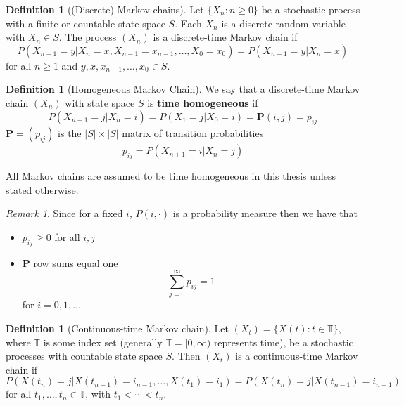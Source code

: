 \documentclass{article}
\theoremstyle{plain}
\theoremstyle{definition}
\newtheorem{defn}[theorem]{Definition}
\theoremstyle{remark}
\newtheorem*{remark}{Remark}
\numberwithin{equation}{section}
\begin{document}
\begin{defn}[(Discrete) Markov chains] \cite{grimmett2001}
Let $\{X_n : n \geq 0\}$ be a stochastic process with a finite or countable state space $S$.
Each $X_n$ is a discrete random variable with $X_n \in S$.
The process $(X_n)$ is a discrete-time Markov chain if
$$
P(X_{n + 1} = y | X_n = x, X_{n - 1} = x_{n - 1}, \ldots, X_0 = x_0) = P(X_{n + 1} = y | X_n = x)
$$
for all $n \geq 1$ and $y, x, x_{n-1}, \ldots, x_0 \in S$.
\end{defn}

\begin{defn}[Homogeneous Markov Chain]\cite{grimmett2001}
We say that a discrete-time Markov chain $(X_n)$ with state space $S$ is \textbf{time homogeneous} if
$$
P(X_{n + 1} = j | X_n = i) = P(X_{1} = j | X_0 = i) = \mathbf{P}(i,j) = p_{ij}
$$
$\mathbf{P} = (p_{ij})$ is the $|S| \times |S|$ matrix of transition probabilities
$$
p_{ij} = P(X_{n + 1} = i | X_n = j)
$$

All Markov chains are assumed to be time homogeneous in this thesis unless stated otherwise.
\end{defn}

\begin{remark}
Since for a fixed $i$, $P(i, \cdot)$ is a probability measure then we have that
\begin{itemize}
    \item $p_{ij} \geq 0$ for all $i,j$
    \item $\mathbf{P}$ row sums equal one
    $$
    \sum_{j = 0}^\infty p_{ij} = 1
    $$
    for $i = 0, 1, \ldots$
\end{itemize}
\end{remark}

\begin{defn}[Continuous-time Markov chain] \cite{grimmett2001}
Let $(X_t) = \{X(t) : t \in \mathbb T\}$, where $\mathbb T$ is some index set (generally $\mathbb T = [0, \infty)$ represents time), be a stochastic processes with countable state space $S$.
Then $(X_t)$ is a continuous-time Markov chain if
$$
P(X(t_n) = j | X(t_{n - 1}) = i_{n-1}, \ldots, X(t_1) = i_{1}) = P(X(t_n) = j | X(t_{n - 1}) = i_{n - 1})
$$
for all $t_1, \ldots, t_n \in \mathbb T$, with $t_1 < \cdots < t_n$.
\end{defn}
\end{document}
